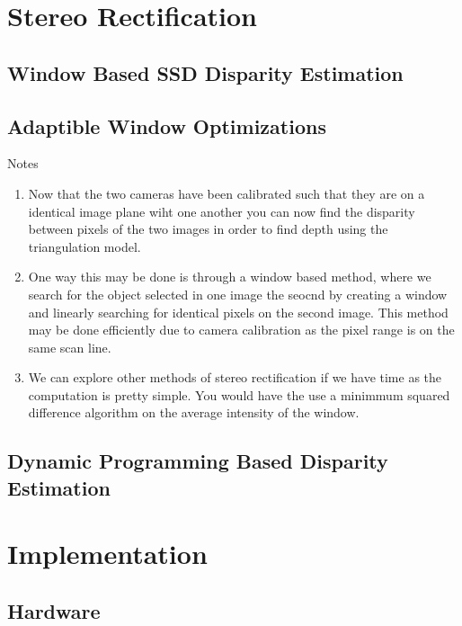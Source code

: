 \documentclass[11pt]{scrartcl}
\begin{document}
\section{Stereo Rectification}

\subsection{Window Based SSD Disparity Estimation}
\subsection{Adaptible Window Optimizations}
\begin{remark}
  Notes{\begin{enumerate}
        \item Now that the two cameras have been calibrated such that they are on a identical image plane wiht one another you can now find the disparity between pixels of the two images in order to find depth using the triangulation model.
        \item One way this may be done is through a window based method, where we search for the object selected in one image the seocnd by creating a window and linearly searching for identical pixels on the second image. This method may be done efficiently due to camera calibration as the pixel range is on the same scan line.
        \item We can explore other methods of stereo rectification if we have time as the computation is pretty simple. You would have the use
              a minimmum squared difference algorithm on the average intensity of the window.
      \end{enumerate}} %
  \label{par:Notes}


\end{remark}

\subsection{Dynamic Programming Based Disparity Estimation}

\section{Implementation}

\subsection{Hardware}
\end{document}
